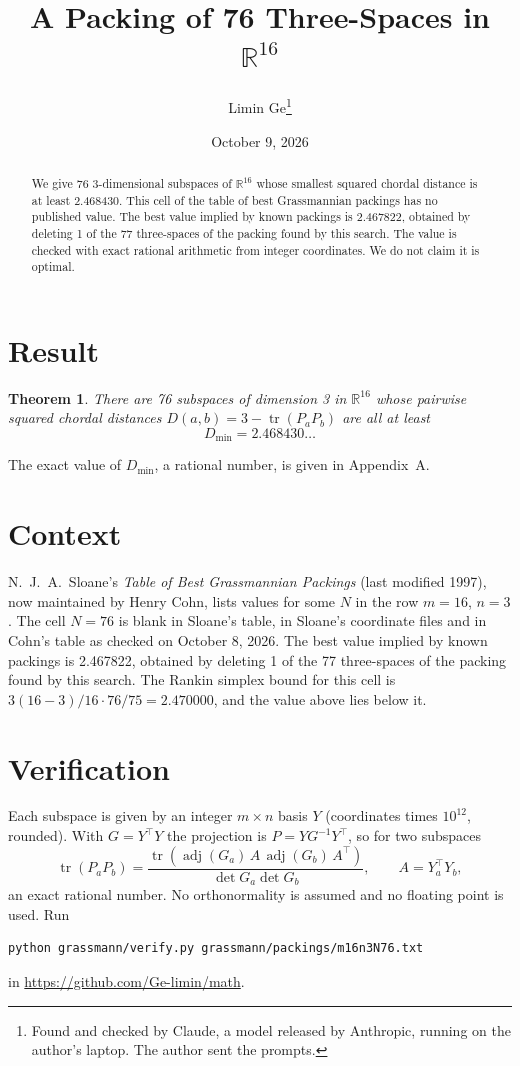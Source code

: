 \documentclass[11pt,a4paper]{article}
\title{A Packing of 76 Three-Spaces in $\mathbb{R}^{16}$}
\author{Limin Ge\thanks{Found and checked by Claude, a model released by Anthropic, running on the author's laptop. The author sent the prompts.}}
\date{October 9, 2026}
\newtheorem*{theorem}{Theorem}
\begin{document}
\maketitle
\begin{abstract}
We give 76 3-dimensional subspaces of $\mathbb{R}^{16}$ whose smallest squared chordal distance is at least 2.468430. This cell of the table of best Grassmannian packings has no published value. The best value implied by known packings is 2.467822, obtained by deleting 1 of the 77 three-spaces of the packing found by this search. The value is checked with exact rational arithmetic from integer coordinates. We do not claim it is optimal.
\end{abstract}

\section{Result}
\begin{theorem}
There are 76 subspaces of dimension 3 in $\mathbb{R}^{16}$ whose pairwise squared chordal distances $D(a,b) = 3 - \operatorname{tr}(P_aP_b)$ are all at least
\[ D_{\min} = 2.468430\ldots \]
\end{theorem}
The exact value of $D_{\min}$, a rational number, is given in Appendix~A.


\section{Context}
N.~J.~A.~Sloane's \emph{Table of Best Grassmannian Packings} (last modified 1997), now maintained by Henry Cohn, lists values for some $N$ in the row $m=16$, $n=3$. The cell $N=76$ is blank in Sloane's table, in Sloane's coordinate files and in Cohn's table as checked on October 8, 2026. The best value implied by known packings is 2.467822, obtained by deleting 1 of the 77 three-spaces of the packing found by this search. The Rankin simplex bound for this cell is $3(16-3)/16\cdot 76/75 = 2.470000$, and the value above lies below it.


\section{Verification}
Each subspace is given by an integer $m\times n$ basis $Y$ (coordinates times $10^{12}$, rounded). With $G=Y^\top Y$ the projection is $P=YG^{-1}Y^\top$, so for two subspaces
\[ \operatorname{tr}(P_aP_b)=\frac{\operatorname{tr}(\operatorname{adj}(G_a)\,A\,\operatorname{adj}(G_b)\,A^\top)}{\det G_a\det G_b},\qquad A=Y_a^\top Y_b, \]
an exact rational number. No orthonormality is assumed and no floating point is used. Run
\begin{verbatim}
python grassmann/verify.py grassmann/packings/m16n3N76.txt
\end{verbatim}
in \url{https://github.com/Ge-limin/math}.
\end{document}
